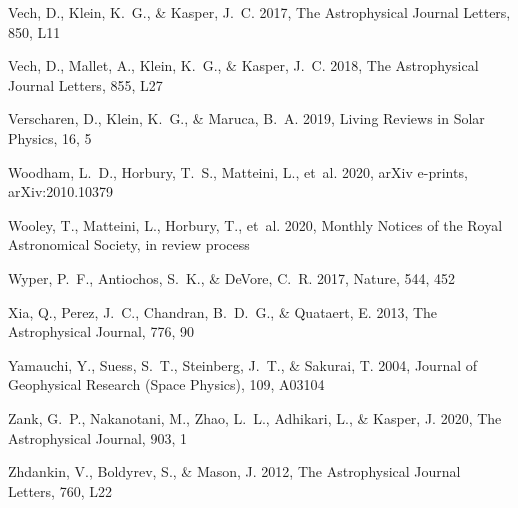 \documentclass[]{aastex62}
\begin{document}
\begin{thebibliography}{}
Vech, D., Klein, K.~G., \& Kasper, J.~C. 2017, The Astrophysical Journal
  Letters, 850, L11

Vech, D., Mallet, A., Klein, K.~G., \& Kasper, J.~C. 2018, The Astrophysical
  Journal Letters, 855, L27

{Verscharen}, D., {Klein}, K.~G., \& {Maruca}, B.~A. 2019, Living Reviews in
  Solar Physics, 16, 5

{Woodham}, L.~D., {Horbury}, T.~S., {Matteini}, L., {et~al.} 2020, arXiv
  e-prints, arXiv:2010.10379

{Wooley}, T., {Matteini}, L., {Horbury}, T., {et~al.} 2020, Monthly Notices of
  the Royal Astronomical Society, in review process

{Wyper}, P.~F., {Antiochos}, S.~K., \& {DeVore}, C.~R. 2017, Nature, 544, 452

{Xia}, Q., {Perez}, J.~C., {Chandran}, B.~D.~G., \& {Quataert}, E. 2013, The
  Astrophysical Journal, 776, 90

{Yamauchi}, Y., {Suess}, S.~T., {Steinberg}, J.~T., \& {Sakurai}, T. 2004,
  Journal of Geophysical Research (Space Physics), 109, A03104

{Zank}, G.~P., {Nakanotani}, M., {Zhao}, L.~L., {Adhikari}, L., \& {Kasper}, J.
  2020, The Astrophysical Journal, 903, 1

{Zhdankin}, V., {Boldyrev}, S., \& {Mason}, J. 2012, The Astrophysical Journal
  Letters, 760, L22

\end{thebibliography}
\end{document}
